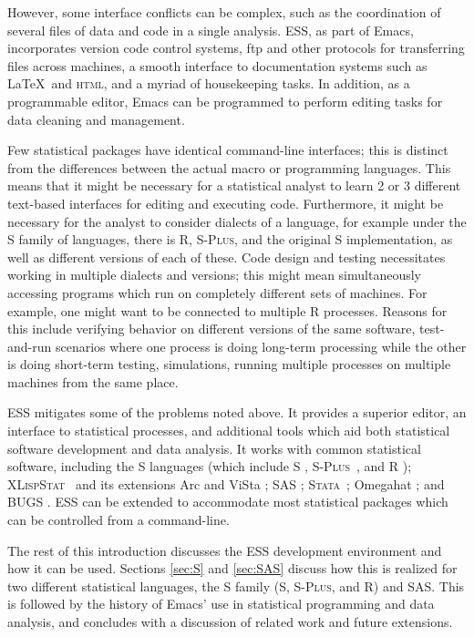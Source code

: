 \documentclass{article}
\newcommand*{\Splus}{\textsc{S-Plus}}
\newcommand*{\XLispStat}{\textsc{XLispStat}}
\newcommand*{\Stata}{\textsc{Stata}}
\begin{document}
However, some interface conflicts can be complex, such as the
coordination of several files of data and code in a single analysis.
ESS, as part of Emacs, incorporates version code control systems, ftp
and other protocols for transferring files across machines, a smooth
interface to documentation systems such as \LaTeX\ and \textsc{html},
and a myriad of housekeeping tasks.  In addition, as a programmable
editor, Emacs can be programmed to perform editing tasks for data
cleaning and management.

Few statistical packages have identical command-line interfaces; this
is distinct from the differences between the actual macro or
programming languages.  This means that it might be necessary for a
statistical analyst to learn 2 or 3 different text-based interfaces
for editing and executing code.  Furthermore, it might be necessary
for the analyst to consider dialects of a language, for example under
the S family of languages, there is R, \Splus, and the original S
implementation, as well as different versions of each of these.  Code
design and testing necessitates working in multiple dialects and
versions; this might mean simultaneously accessing programs which run
on completely different sets of machines.  For example, one might want
to be connected to multiple R processes.  Reasons for this include
verifying behavior on different versions of the same software,
test-and-run scenarios where one process is doing long-term processing
while the other is doing short-term testing, simulations, running
multiple processes on multiple machines from the same place.

ESS mitigates some of the problems noted above.  It provides a
superior editor, an interface to statistical processes, and additional
tools which aid both statistical software development and data
analysis.  It works with common statistical software, including the S
languages (which include S \citep{BecRCW88,ChaJH92,ChaJ98}, \Splus\ 
\citep{Splus}, and R \citep{ihak:gent:1996}); \XLispStat\ 
\citep{Tier90} and its extensions Arc \citep{Cook:Weisberg:1999} and
ViSta \citep{youn:fald:mcfa:1992}; SAS \citep{SAS:8.0}; \Stata\ 
\citep{Stata:6.0}; Omegahat \citep{DTLang:2000}; and BUGS
\citep{SpieThomBest:1999}.  ESS can be extended to accommodate most
statistical packages which can be controlled from a command-line.

The rest of this introduction discusses the ESS development
environment and how it can be used.  Sections \ref{sec:S} and
\ref{sec:SAS} discuss how this is realized for two different
statistical languages, the S family (S, \Splus, and R) and SAS.  This
is followed by the history of Emacs' use in statistical programming
and data analysis, and concludes with a discussion of related work and
future extensions.
\end{document}
